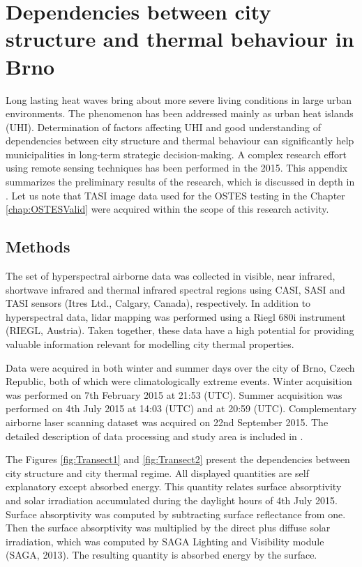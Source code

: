 \chapter{Dependencies between city structure and thermal behaviour in Brno}
\label{app:Visualisation}

Long lasting heat waves bring about more severe living conditions in large urban environments. The phenomenon has been addressed mainly as urban heat islands (UHI). Determination of factors affecting UHI and good understanding of dependencies between city structure and thermal behaviour can significantly help municipalities in long-term strategic decision-making. A complex research effort using remote sensing techniques has been performed in the 2015. This appendix summarizes the preliminary results of the research, which is discussed in depth in \cite{NP16}. Let us note that TASI image data used for the OSTES testing in the Chapter \ref{chap:OSTESValid} were acquired within the scope of this research activity.

\section{Methods} 

The set of hyperspectral airborne data was collected in visible, near infrared, shortwave infrared and thermal infrared spectral regions using CASI, SASI and TASI sensors (Itres Ltd., Calgary, Canada), respectively. In addition to hyperspectral data, lidar mapping was performed using a Riegl 680i instrument (RIEGL, Austria). Taken together, these data have a high potential for providing valuable information relevant for modelling city thermal properties.

Data were acquired in both winter and summer days over the city of Brno, Czech Republic, both of which were climatologically extreme events. Winter acquisition was performed on 7th February 2015 at 21:53 (UTC). Summer acquisition was performed on 4th July 2015 at 14:03 (UTC) and at 20:59 (UTC). Complementary airborne laser scanning dataset was acquired on 22nd September 2015. The detailed description of data processing and study area is included in \cite{NP16}. 

The Figures \ref{fig:Transect1} and \ref{fig:Transect2} present the dependencies between city structure and city thermal regime. All displayed quantities are self explanatory except absorbed energy. This quantity relates surface absorptivity and solar irradiation accumulated during the daylight hours of 4th July 2015. Surface absorptivity was computed by subtracting surface reflectance from one. Then the surface absorptivity was multiplied by the direct plus diffuse solar irradiation, which was computed by SAGA Lighting and Visibility module (SAGA, 2013). The resulting quantity is absorbed energy by the surface.

